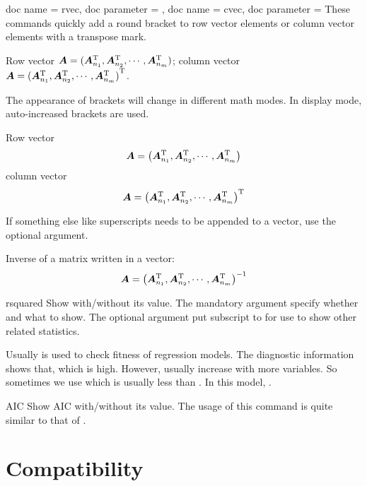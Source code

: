 \documentclass{article}
\begin{document}
\begin{docCommands}{
    {doc name = rvec, doc parameter = },
    {doc name = cvec, doc parameter = }
}
These commands quickly add a round bracket to row vector elements or column vector elements with a transpose mark.
\begin{dispExample}
Row vector $\vA = \rvec{\vA_{n_1}\T,\vA_{n_2}\T,\cdots,\vA_{n_m}\T}$;
column vector $\vA = \cvec{\vA_{n_1}\T,\vA_{n_2}\T,\cdots,\vA_{n_m}\T}$.
\end{dispExample}
The appearance of brackets will change in different math modes. 
In display mode, auto-increased brackets are used.
\begin{dispExample}
Row vector 
$$\vA = \rvec{\vA_{n_1}\T,\vA_{n_2}\T,\cdots,\vA_{n_m}\T}$$
column vector 
$$\vA = \cvec{\vA_{n_1}\T,\vA_{n_2}\T,\cdots,\vA_{n_m}\T}$$
\end{dispExample}
If something else like superscripts needs to be appended to a vector, use the optional argument.
\begin{dispExample}
Inverse of a matrix written in a vector: 
$$\vA = \rvec{\vA_{n_1}\T,\vA_{n_2}\T,\cdots,\vA_{n_m}\T}[\I]$$
\end{dispExample}
\end{docCommands}

\begin{docCommand}{rsquared}{}
Show \rsquared{} with/without its value. The mandatory argument  specify whether and what to show. The optional argument  put subscript to \rsquared for use to show other related statistics.
\begin{dispExample}
Usually \rsquared{} is used to check fitness of regression models.
The diagnostic information shows that,  which is high.
However, \rsquared{} usually increase with more variables.
So sometimes we use \rsquared[adj]{} which is usually less than \rsquared{}. 
In this model, .
\end{dispExample}
\end{docCommand}

\begin{docCommand}{AIC}{}
    Show AIC with/without its value. The usage of this command is quite similar to that of .
\end{docCommand}

\section{Compatibility}
\end{document}
